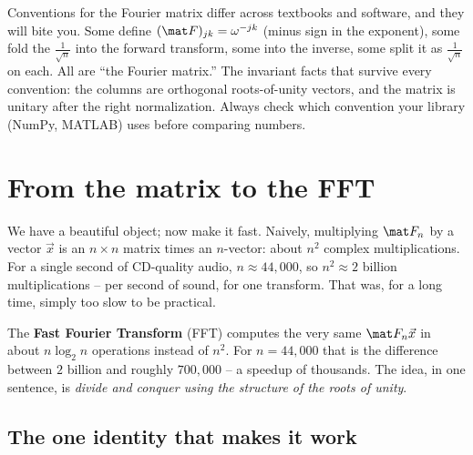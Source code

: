 \begin{trapbox}
Conventions for the Fourier matrix differ across textbooks and software, and they
will bite you. Some define $(\mat F)_{jk}=\omega^{-jk}$ (minus sign in the
exponent), some fold the $\tfrac1{\sqrt n}$ into the forward transform, some into
the inverse, some split it as $\tfrac1{\sqrt n}$ on each. All are ``the Fourier
matrix.'' The invariant facts that survive every convention: the columns are
orthogonal roots-of-unity vectors, and the matrix is unitary after the right
normalization. Always check which convention your library (NumPy, MATLAB) uses
before comparing numbers.
\end{trapbox}

\section{From the matrix to the FFT}

We have a beautiful object; now make it fast. Naively, multiplying $\mat F_n$ by a
vector $\vec x$ is an $n\times n$ matrix times an $n$-vector: about $n^2$ complex
multiplications. For a single second of CD-quality audio, $n\approx 44{,}000$, so
$n^2\approx 2$ billion multiplications -- per second of sound, for one transform.
That was, for a long time, simply too slow to be practical.

The \textbf{Fast Fourier Transform} (FFT) computes the very same $\mat F_n\vec x$
in about $n\log_2 n$ operations instead of $n^2$. For $n=44{,}000$ that is the
difference between $2$ billion and roughly $700{,}000$ -- a speedup of thousands.
The idea, in one sentence, is \emph{divide and conquer using the structure of the
roots of unity}.

\subsection{The one identity that makes it work}

